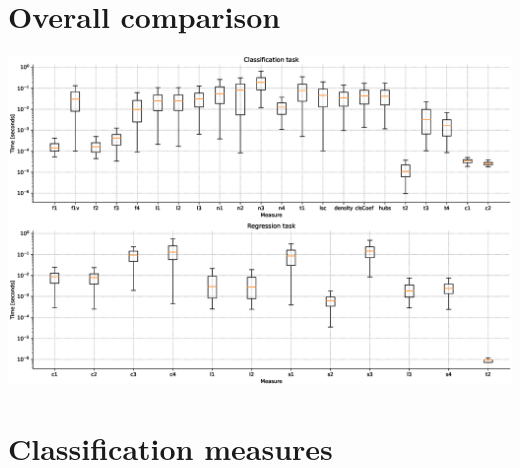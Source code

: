 \documentclass[11pt]{article}
\begin{document}
\section{Overall comparison}

\noindent\begin{center}
	\includegraphics[width=\textwidth]{figures/time.eps}
\end{center}

\section{Classification measures}
\end{document}
